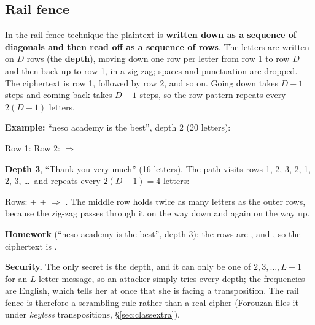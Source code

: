 \subsection{Rail fence}
In the rail fence technique the plaintext is \textbf{written down as a sequence of diagonals and then read off as a sequence of rows}. The letters are written on $D$ rows (the \textbf{depth}), moving down one row per letter from row 1 to row $D$ and then back up to row 1, in a zig-zag; spaces and punctuation are dropped. The ciphertext is row 1, followed by row 2, and so on. Going down takes $D - 1$ steps and coming back takes $D - 1$ steps, so the row pattern repeats every $2(D-1)$ letters.

\textbf{Example:} ``neso academy is the best'', depth 2 (20 letters):
\begin{center}
\end{center}
Row 1: \quad Row 2: \quad $\Rightarrow$\quad \textbf{}

\textbf{Depth 3}, ``Thank you very much'' (16 letters). The path visits rows 1, 2, 3, 2, 1, 2, 3, \dots\ and repeats every $2(D-1) = 4$ letters:
\begin{center}
\end{center}
Rows:  +  +  $\Rightarrow$ \textbf{}. The middle row holds twice as many letters as the outer rows, because the zig-zag passes through it on the way down and again on the way up.

\textbf{Homework} (``neso academy is the best'', depth 3): the rows are ,  and , so the ciphertext is \textbf{}.

\textbf{Security.} The only secret is the depth, and it can only be one of $2, 3, \dots, L - 1$ for an $L$-letter message, so an attacker simply tries every depth; the frequencies are English, which tells her at once that she is facing a transposition. The rail fence is therefore a scrambling rule rather than a real cipher (Forouzan files it under \emph{keyless} transpositions, \S\ref{sec:classextra}).


